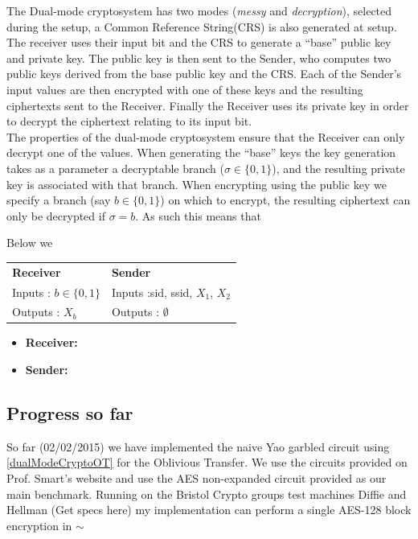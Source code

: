 \documentclass[a4paper,10pt]{article}
\begin{document}
			The Dual-mode cryptosystem has two modes (\emph{messy} and \emph{decryption}), selected during the setup, a Common Reference String(CRS) is also generated at setup. The receiver uses their input bit and the CRS to generate  a ``base'' public key and private key. The public key is then sent to the Sender, who computes two public keys derived from the base public key and the CRS. Each of the Sender's input values are then encrypted with one of these keys and the resulting ciphertexts sent to the Receiver. Finally the Receiver uses its private key in order to decrypt the ciphertext relating to its input bit.\\

			The properties of the dual-mode cryptosystem ensure that the Receiver can only decrypt one of the values. When generating the ``base'' keys the key generation takes as a parameter a decryptable branch ($\sigma \in \{0, 1\}$), and the resulting private key is associated with that branch. When encrypting using the public key we specify a branch (say $b \in \{0, 1\}$) on which to encrypt, the resulting ciphertext can only be decrypted if $\sigma = b$. As such this means that 

			Below we 

			\begin{tabular}[!htb]{p{6cm} p{6cm}}
				\textbf{Receiver} & \textbf{Sender}\\
				Inputs : $b \in \{0, 1\}$ & Inputs :sid, ssid, $X_1$, $X_2$\\
				Outputs : $X_b$ & Outputs : $\emptyset$\
			\end{tabular}

			\begin{itemize}
				\setlength{\itemsep}{0.5pt}
				\setlength{\parskip}{0pt}
				\setlength{\parsep}{0pt}

				\item \textbf{Receiver:} 
				\item \textbf{Sender:} 
			\end{itemize}


		\subsection{Progress so far}
			So far (02/02/2015) we have implemented the naive Yao garbled circuit using \ref{dualModeCryptoOT} for the Oblivious Transfer. We use the circuits provided on Prof. Smart's website \cite{NigelCircuits} and use the AES non-expanded circuit provided as our main benchmark. Running on the Bristol Crypto groups test machines Diffie and Hellman (Get specs here) my implementation can perform a single AES-128 block encryption in $\sim $
\end{document}
